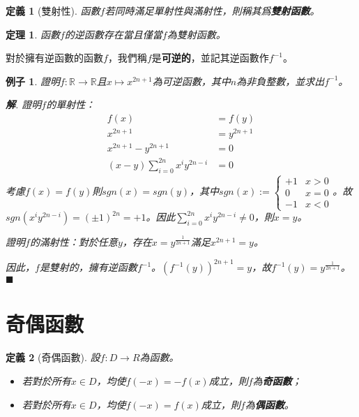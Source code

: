 \documentclass[12pt]{article}
\newtheorem{definition}{定義}
\newtheorem*{theorem}{定理}
\newtheorem*{example}{例子}
\newenvironment*{sol}{\par \textbf{解}.}{\hfill$\blacksquare$}
\begin{document}
    \begin{definition}[雙射性]
        函數$f$若同時滿足單射性與滿射性，則稱其爲\textbf{雙射函數}。
    \end{definition}

    \begin{theorem}
        函數$f$的逆函數存在當且僅當$f$為雙射函數。
    \end{theorem}

    對於擁有逆函數的函數$f$，我們稱$f$是\textbf{可逆的}，並記其逆函數作$f^{-1}$。

    \begin{example}
        證明$f:\mathbb{R}\to\mathbb{R}$且$x\mapsto x^{2n+1}$為可逆函數，其中$n$為非負整數，並求出$f^{-1}$。

        \begin{sol}
            證明$f$的單射性：\begin{align*}
                f(x)&=f(y)\\
                x^{2n+1}&=y^{2n+1}\\
                x^{2n+1}-y^{2n+1}&=0\\
                (x-y)\sum_{i=0}^{2n}x^i y^{2n-i}&=0
            \end{align*}
            考慮$f(x)=f(y)$則$sgn(x)=sgn(y)$，其中$sgn(x):=\begin{cases}
                +1&x>0\\
                0&x=0\\
                -1&x<0
            \end{cases}$。故$sgn(x^i y^{2n-i})=(\pm 1)^{2n}=+1$。因此$\displaystyle\sum_{i=0}^{2n}x^i y^{2n-i}\neq 0$，則$x=y$。

            證明$f$的滿射性：對於任意$y$，存在$x=y^{\frac{1}{2n+1}}$滿足$x^{2n+1}=y$。

            因此，$f$是雙射的，擁有逆函數$f^{-1}$。$(f^{-1}(y))^{2n+1}=y$，故$f^{-1}(y)=y^{\frac{1}{2n+1}}$。
        \end{sol}
    \end{example}

    \section*{奇偶函數}

    \begin{definition}[奇偶函數]
        設$f:D\to R$為函數。\begin{itemize}
            \item 若對於所有$x\in D$，均使$f(-x)=-f(x)$成立，則$f$為\textbf{奇函數}；
            \item 若對於所有$x\in D$，均使$f(-x)=f(x)$成立，則$f$為\textbf{偶函數}。
        \end{itemize}
    \end{definition}
\end{document}
